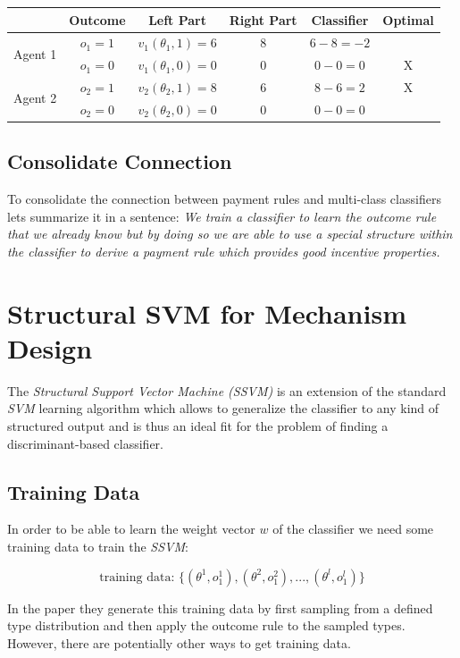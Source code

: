 \documentclass[]{article}
\newcommand\Tstrut{\rule{0pt}{2.6ex}}         %
\begin{document}
\noindent
\begin{tabular}{|c|c|c|c|c|c|}
	\hline 
	& \textbf{Outcome} & \textbf{Left Part} & \textbf{Right Part} & \textbf{Classifier} & \textbf{Optimal} \Tstrut \\ 
	\hline 
	\multirow{2}{*}{Agent 1} 	&$o_{1}=1$		& 	$v_{1}(\theta_{1},1) = 6$ 	& 8	&$6 - 8 = -2$ &	\Tstrut \\\cline{2-6}
	&$o_{1}=0$	&	$v_{1}(\theta_{1},0) = 0$	& 0	&$0 - 0 = 0$ &X	\Tstrut\\ 
	\hline 
	\multirow{2}{*}{Agent 2}  	&$o_{2}=1$	&	$v_{2}(\theta_{2},1) = 8$	& 6	&$8-6 = 2$	&X	\Tstrut \\	\cline{2-6}
	&$o_{2}=0$		&	$v_{2}(\theta_{2},0) = 0$	& 0	&$0 - 0 = 0$ & \Tstrut\\ 
	\hline 
\end{tabular} 


\subsection{Consolidate Connection}
To consolidate the connection between payment rules and multi-class classifiers lets summarize it in a sentence:
\emph{We train a classifier to learn the outcome rule that we already know but by doing so we are able to use a special structure within the classifier to derive a payment rule which provides good incentive properties.}


\section{Structural SVM for Mechanism Design}
The \emph{Structural Support Vector Machine (SSVM)} is an extension of the standard \emph{SVM} learning algorithm which allows to generalize the classifier to any kind of structured output and is thus an ideal fit for the problem of finding a discriminant-based classifier.

\subsection{Training Data}
In order to be able to learn the weight vector $w$ of the classifier we need some training data to train the \emph{SSVM}:

\begin{equation*}
\text{training data: }\{(\theta^{1}, o_{1}^{1}),(\theta^{2}, o_{1}^{2}),...,(\theta^{l}, o_{1}^{l})\}
\end{equation*}

\noindent In the paper they generate this training data by first sampling from a defined type distribution and then apply the outcome rule to the sampled types. However, there are potentially other ways to get training data.
\end{document}
